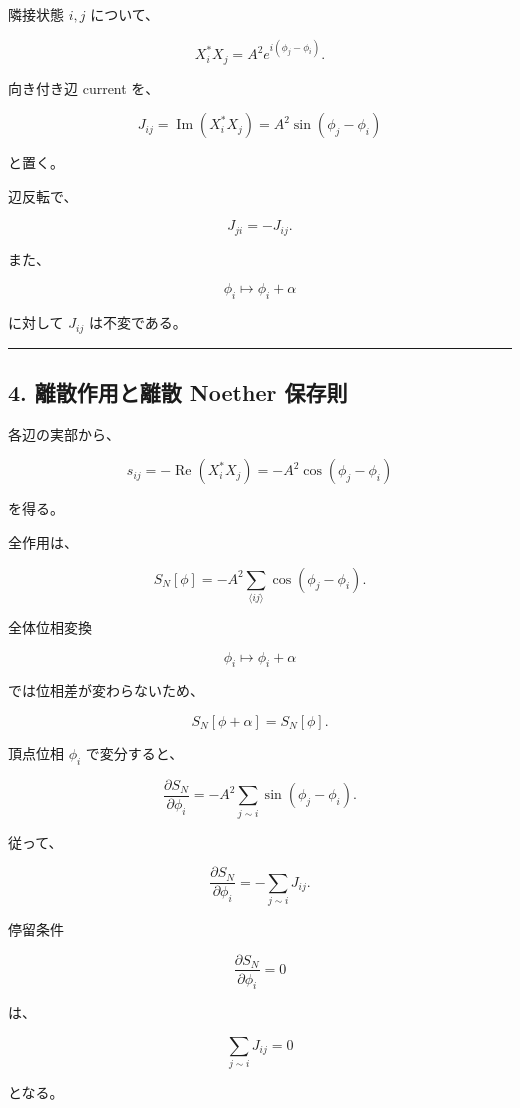 \documentclass[
  a4paper,
]{ltjsarticle}
\begin{document}
隣接状態 \(i,j\) について、

\[
X_i^*X_j
=
A^2e^{i(\phi_j-\phi_i)}.
\tag{6}
\]

向き付き辺 current を、

\[
\boxed{
J_{ij}
=
\operatorname{Im}(X_i^*X_j)
=
A^2\sin(\phi_j-\phi_i)
}
\tag{7}
\]

と置く。

辺反転で、

\[
\boxed{
J_{ji}=-J_{ij}.
}
\tag{8}
\]

また、

\[
\phi_i\mapsto\phi_i+\alpha
\]

に対して \(J_{ij}\) は不変である。

\begin{center}\rule{0.5\linewidth}{0.5pt}\end{center}

\subsection{4. 離散作用と離散 Noether
保存則}\label{ux96e2ux6563ux4f5cux7528ux3068ux96e2ux6563-noether-ux4fddux5b58ux5247}

各辺の実部から、

\[
s_{ij}
=
-\operatorname{Re}(X_i^*X_j)
=
-A^2\cos(\phi_j-\phi_i)
\tag{9}
\]

を得る。

全作用は、

\[
\boxed{
S_N[\phi]
=
-A^2
\sum_{\langle ij\rangle}
\cos(\phi_j-\phi_i).
}
\tag{10}
\]

全体位相変換

\[
\phi_i\mapsto\phi_i+\alpha
\]

では位相差が変わらないため、

\[
\boxed{
S_N[\phi+\alpha]=S_N[\phi].
}
\tag{11}
\]

頂点位相 \(\phi_i\) で変分すると、

\[
\frac{\partial S_N}{\partial\phi_i}
=
-A^2
\sum_{j\sim i}
\sin(\phi_j-\phi_i).
\]

従って、

\[
\boxed{
\frac{\partial S_N}{\partial\phi_i}
=
-\sum_{j\sim i}J_{ij}.
}
\tag{12}
\]

停留条件

\[
\frac{\partial S_N}{\partial\phi_i}=0
\]

は、

\[
\boxed{
\sum_{j\sim i}J_{ij}=0
}
\tag{13}
\]

となる。
\end{document}
